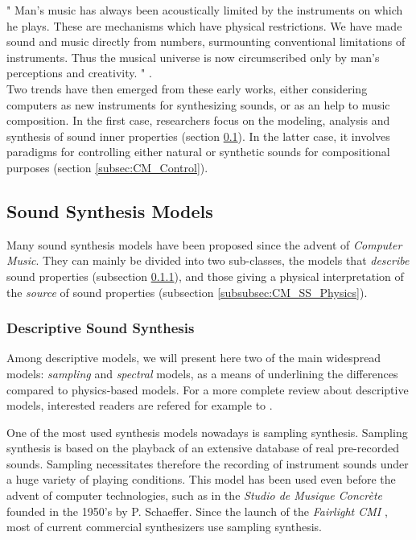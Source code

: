 {{" Man's music has always been acoustically limited by the instruments on which he plays. These are mechanisms which have physical restrictions. We have made sound and music directly from numbers, surmounting conventional limitations of instruments. Thus the musical universe is now circumscribed only by man's perceptions and creativity. " .\\

Two trends have then emerged from these early works, either considering computers as new instruments for synthesizing sounds, or as an help to music composition. In the first case, researchers focus on the modeling, analysis and synthesis of sound inner properties (section \ref{subsec:CM_SS}). In the latter case, it involves paradigms for controlling either natural or synthetic sounds for compositional purposes (section \ref{subsec:CM_Control}).


		\subsection{Sound Synthesis Models}
		\label{subsec:CM_SS}

Many sound synthesis models have been proposed since the advent of \emph{Computer Music}. They can mainly be divided into two sub-classes, the models that \emph{describe} sound properties (subsection \ref{subsubsec:CM_SS_Descriptive}), and those giving a physical interpretation of the \emph{source} of sound properties (subsection \ref{subsubsec:CM_SS_Physics}).


			\subsubsection{Descriptive Sound Synthesis}
			\label{subsubsec:CM_SS_Descriptive}

Among descriptive models, we will present here two of the main widespread models: \emph{sampling} and \emph{spectral} models, as a means of underlining the differences compared to physics-based models. For a more complete review about descriptive models, interested readers are refered for example to .


				\label{subsubsubsec:CM_SS_Desc_Sampling}

One of the most used synthesis models nowadays is sampling synthesis. Sampling synthesis is based on the playback of an extensive database of real pre-recorded sounds. Sampling necessitates therefore the recording of instrument sounds under a huge variety of playing conditions. This model has been used even before the advent of computer technologies, such as in the \emph{Studio de Musique Concr{\`e}te} founded in the 1950's by P. Schaeffer. Since the launch of the \emph{Fairlight CMI} , most of current commercial synthesizers use sampling synthesis.\\

}}
